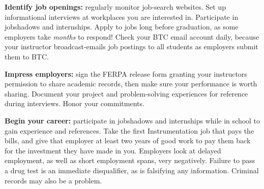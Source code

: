\noindent

\vskip 10pt

\noindent

\vskip 10pt

\noindent
{\bf Identify job openings:} regularly monitor job-search websites.  Set up informational interviews at workplaces you are interested in.  Participate in jobshadows and internships.  Apply to jobs long before graduation, as some employers take {\it months} to respond!  Check your BTC email account daily, because your instructor broadcast-emails job postings to all students as employers submit them to BTC.

\vskip 10pt

\noindent
{\bf Impress employers:} sign the FERPA release form granting your instructors permission to share academic records, then make sure your performance is worth sharing.  Document your project and problem-solving experiences for reference during interviews.  Honor  your commitments.

\vskip 10pt

\noindent
{\bf Begin your career:} participate in jobshadows and internships while in school to gain experience and references.  Take the first Instrumentation job that pays the bills, and give that employer at least two years of good work to pay them back for the investment they have made in you.  Employers look at delayed employment, as well as short employment spans, very negatively.  Failure to pass a drug test is an immediate disqualifier, as is falsifying any information.  Criminal records may also be a problem.








\vfil

\eject

